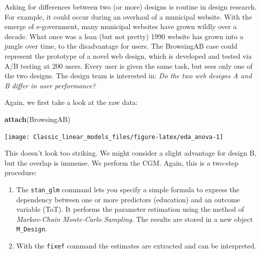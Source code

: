 \documentclass[]{svmono}
\newenvironment{Shaded}{\begin{snugshade}}{\end{snugshade}}
\newcommand{\KeywordTok}[1]{\textcolor[rgb]{0.13,0.29,0.53}{\textbf{#1}}}
\newcommand{\DataTypeTok}[1]{\textcolor[rgb]{0.13,0.29,0.53}{#1}}
\newcommand{\StringTok}[1]{\textcolor[rgb]{0.31,0.60,0.02}{#1}}
\newcommand{\OperatorTok}[1]{\textcolor[rgb]{0.81,0.36,0.00}{\textbf{#1}}}
\newcommand{\NormalTok}[1]{#1}
\providecommand{\tightlist}{%
  \setlength{\itemsep}{0pt}\setlength{\parskip}{0pt}}
\begin{document}
Asking for differences between two (or more) designs is routine in
design research. For example, it could occur during an overhaul of a
municipal website. With the emerge of e-government, many municipal
websites have grown wildly over a decade. What once was a lean (but not
pretty) 1990 website has grown into a jungle over time, to the
disadvantage for users. The BrowsingAB case could represent the
prototype of a novel web design, which is developed and tested via A/B
testing at 200 users. Every user is given the same task, but sees only
one of the two designs. The design team is interested in: \emph{Do the
two web designs A and B differ in user performance?}

Again, we first take a look at the raw data:

\begin{Shaded}
\begin{Highlighting}[]
\KeywordTok{attach}\NormalTok{(BrowsingAB)}
\end{Highlighting}
\end{Shaded}

\begin{Shaded}
\end{Shaded}

\texttt{[image: Classic\_linear\_models\_files/figure-latex/eda\_anova-1]}

This doesn't look too striking. We might consider a slight advantage for
design B, but the overlap is immense. We perform the CGM. Again, this is
a two-step procedure:

\begin{enumerate}
\def\labelenumi{\arabic{enumi}.}
\tightlist
\item
  The \texttt{stan\_glm} command lets you specify a simple formula to
  express the dependency between one or more predictors (education) and
  an outcome variable (ToT). It performs the parameter estimation using
  the method of \emph{Markov-Chain Monte-Carlo Sampling}. The results
  are stored in a new object \texttt{M\_Design}.
\item
  With the \texttt{fixef} command the estimates are extracted and can be
  interpreted.
\end{enumerate}
\end{document}

